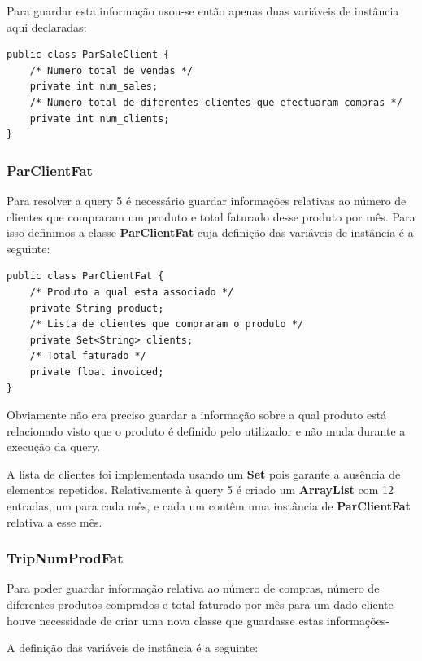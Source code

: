 \documentclass[10pt] {article}
\begin{document}
Para guardar esta informação usou-se então apenas duas variáveis de instância aqui declaradas:

\begin{lstlisting}
public class ParSaleClient {
	/* Numero total de vendas */
	private int num_sales;
	/* Numero total de diferentes clientes que efectuaram compras */
	private int num_clients;
}
\end{lstlisting}

\subsubsection{ParClientFat}

Para resolver a query 5 é necessário guardar informações relativas ao número de clientes que compraram um produto e total faturado desse produto por mês. Para isso definimos a classe \color{blue} \textbf{ParClientFat} \color{black} cuja definição das variáveis de
instância é a seguinte:

\begin{lstlisting}
public class ParClientFat {
	/* Produto a qual esta associado */
	private String product;
	/* Lista de clientes que compraram o produto */
	private Set<String> clients;
	/* Total faturado */
	private float invoiced;
}
\end{lstlisting}


Obviamente não era preciso guardar a informação sobre a qual produto está relacionado visto que o produto é definido pelo utilizador e não muda durante a execução da query.

A lista de clientes foi implementada usando um \color{blue} \textbf{Set} \color{black} pois garante a ausência de elementos
repetidos.
Relativamente à query 5 é criado um \color{blue} \textbf{ArrayList} \color{black} com 12 entradas, um para cada mês, e cada
um contêm uma instância de \color{blue} \textbf{ParClientFat} \color{black} relativa a esse mês.

\subsubsection{TripNumProdFat}

Para poder guardar informação relativa ao número de compras, número de diferentes produtos comprados e total faturado por mês para um dado cliente houve necessidade de criar uma nova classe que guardasse estas informações-

A definição das variáveis de instância é a seguinte:
\end{document}
